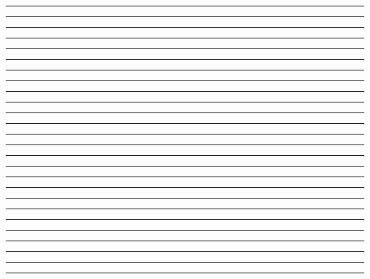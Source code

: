 \documentclass{article}
\begin{document}
\newpage
\noindent{}\rule{1cm}{0.025cm}

\newpage
\noindent{}\rule{1cm}{0.025cm}

\newpage
\noindent{}\rule{1cm}{0.025cm}

\newpage
\noindent{}\rule{1cm}{0.025cm}

\newpage
\noindent{}\rule{1cm}{0.025cm}

\newpage
\noindent{}\rule{1cm}{0.025cm}

\newpage
\noindent{}\rule{1cm}{0.025cm}

\newpage
\noindent{}\rule{1cm}{0.025cm}

\newpage
\noindent{}\rule{1cm}{0.025cm}

\newpage
\noindent{}\rule{1cm}{0.025cm}

\newpage
\noindent{}\rule{1cm}{0.025cm}

\newpage
\noindent{}\rule{1cm}{0.025cm}

\newpage
\noindent{}\rule{1cm}{0.025cm}

\newpage
\noindent{}\rule{1cm}{0.025cm}

\newpage
\noindent{}\rule{1cm}{0.025cm}

\newpage
\noindent{}\rule{1cm}{0.025cm}

\newpage
\noindent{}\rule{1cm}{0.025cm}

\newpage
\noindent{}\rule{1cm}{0.025cm}

\newpage
\noindent{}\rule{1cm}{0.025cm}

\newpage
\noindent{}\rule{1cm}{0.025cm}

\newpage
\noindent{}\rule{1cm}{0.025cm}

\newpage
\noindent{}\rule{1cm}{0.025cm}

\newpage
\noindent{}\rule{1cm}{0.025cm}

\newpage
\noindent{}\rule{1cm}{0.025cm}

\newpage
\noindent{}\rule{1cm}{0.025cm}

\newpage
\noindent{}\rule{1cm}{0.025cm}
\end{document}
